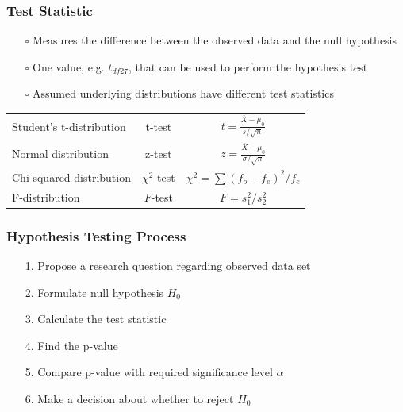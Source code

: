 \documentclass[handout]{beamer}
\begin{document}
\begin{frame}
    \frametitle{Test Statistic}
    \begin{itemize}[wide = 0pt]
        \item[$\square$] Measures the difference between the observed data and the null hypothesis
        \item[$\square$] One value, e.g. $t_{df27}$, that can be used to perform the hypothesis test
        \item[$\square$] Assumed underlying distributions have different test statistics
    \end{itemize} 
    \vspace{5pt}
    \centering
    \renewcommand{\arraystretch}{1.5}
    \begin{tabular}{l c c}
    \toprule
        Student's t-distribution & t-test & $t=\frac{\overline{X}-\mu_0}{s/\sqrt{n}}$ \\
        Normal distribution & z-test & $z=\frac{\overline{X}-\mu_0}{\sigma/\sqrt{n}}$ \\
        Chi-squared distribution & $\chi^2$ test & $\chi^2=\sum (f_o-f_e)^2/f_e$ \\
        F-distribution & $F$-test & $F=s_1^2/s_2^2$ \\
    \bottomrule
    \end{tabular}
    \renewcommand{\arraystretch}{1.0}
    \vspace*{\fill}
\end{frame}

\begin{frame}
    \frametitle{Hypothesis Testing Process}
    \begin{itemize}[wide = 0pt]
        \item[1.] Propose a research question regarding observed data set
        \item[2.] Formulate null hypothesis $H_0$
        \item[3.] Calculate the test statistic
        \item[4.] Find the p-value
        \item[5.] Compare p-value with required significance level $\alpha$
        \item[6.] Make a decision about whether to reject $H_0$
    \end{itemize} 
    \vspace*{\fill}
\end{frame}
\end{document}
